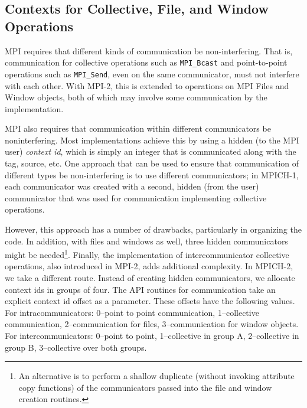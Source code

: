 \documentclass{article}
\def\code#1{\texttt{#1}}
\begin{document}
\subsection{Contexts for Collective, File, and Window Operations}
\label{sec:comm-for-coll}
MPI requires that different kinds of communication be
non-interfering.  That is, communication for collective operations
such as \code{MPI_Bcast} and point-to-point operations such as
\code{MPI_Send}, even on the same communicator, must not interfere
with each other.  With MPI-2, this is extended to operations on MPI
Files and Window objects, both of which may involve some communication
by the implementation.

MPI also requires that communication within different
communicators be noninterfering.  Most implementations achieve this by
using a hidden (to the MPI user) \emph{context id}, which is simply an
integer that is communicated along with the tag, source, etc.  
One approach that can be used to ensure that
communication of different types be non-interfering is to use
different communicators; in MPICH-1, each communicator was created
with a second, hidden (from the user) communicator that was used for
communication implementing collective operations.  

However, this approach has a number of drawbacks, particularly in
organizing the code.  In addition, with files and windows as well,
three hidden communicators might be needed\footnote{An alternative is
to perform a shallow duplicate (without invoking attribute copy
functions) of the communicators passed into the file and window
creation routines.}.  Finally, the implementation of intercommunicator
collective operations, also introduced in MPI-2, adds additional
complexity.  In MPICH-2, we take a different route.  Instead of
creating hidden communicators, we allocate context ids in groups of
four.  The API routines for communication take an explicit context id
offset as a parameter.  These offsets have the following values.  For
intracommunicators: 0--point to point communication, 1--collective
communication, 2--communication for files, 3--communication for window
objects.  For intercommunicators: 0--point to point, 1--collective in
group A, 2--collective in group B, 3--collective over both groups.
%
\end{document}
